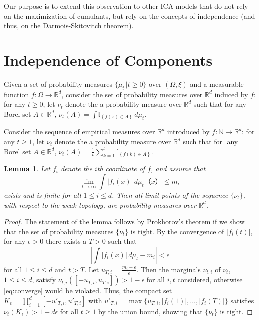 \documentclass[english]{article} %
\newcommand{\ind}[1]{\mathbb{I}_{\left\{ #1 \right\}}}
\newcommand{\real}{\mathbb{R}}
\renewcommand{\natural}{\mathbb{N}}
\providecommand{\lemmaname}{Lemma}
\theoremstyle{plain}
\newtheorem{lemma}[thm]{\protect\lemmaname}
\theoremstyle{definition}
\theoremstyle{remark}
\begin{document}
Our purpose is to extend this observation to other ICA models that do not rely on the maximization of cumulants, but rely on the concepts of independence (and thus, on the Darmois-Skitovitch theorem).

\section{Independence of Components}
\label{sec:IndeofComp}
Given a set of probability measures $\{\mu_t\, \vert t\ge0 \}$ over $(\Omega, \xi)$ and a measurable function $f:\Omega\rightarrow\real^d$, 
consider the set of probability measures over $\real^d$ induced by $f$: 
for any $t\ge0$, let $\nu_t$ denote the a probability measure over $\real^d$ such that for any Borel set $A \in \real^d$, $\nu_t(A)=\int \ind{f(x) \in A}\, d\mu_t$. 

Consider the sequence of empirical measures over $\real^d$ introduced by $f:\natural \rightarrow \real^d$: for any $t\ge 1$, let $\nu_t$ denote the a probability measure over $\real^d$ such that
for $ $ any Borel set $A \in \real^d$, $\nu_t(A)=\tfrac{1}{t} \sum_{k=1}^t \ind{f(k) \in A}$. 
\fi

\begin{lemma}
\label{lem:nicefunction}
Let $f_i$ denote the $i$th coordinate of $f$, and assume that
\begin{equation}
\label{eq:niceproperty}
\lim_{t\to\infty} \int |f_i(x)|\, d\mu_t（x） \le m_i
\end{equation}
exists and is finite for all $1 \le i \le d$.
Then all limit points of the sequence $\{\nu_t\}$, with respect to the weak topology, are probability measures over $\real^d$.
\end{lemma}
\begin{proof}
The statement of the lemma follows by Prokhorov's theorem if we show that the set of probability measures $\{\nu_t\}$ is tight.
By the convergence of $|f_i(t)|$, for any $\epsilon>0$ there exists a $T>0$ such that
\begin{equation}
\label{eq:converge}
\left| \int |f_i(x)|\, d\mu_t - m_i \right| <\epsilon
\end{equation}
for all $1 \le i \le d$ and $t>T$. Let $u_{T,i}=\tfrac{m_i+\epsilon}{\epsilon}$. Then the marginals
$\nu_{t,i}$ of $\nu_t$, $1\le i \le d$, satisfy $\nu_{t,i}([-u_{T,i},u_{T,i}]) > 1-\epsilon$ for all $i,t$ considered, otherwise \eqref{eq:converge} would be violated. Thus, the compact set
$K_{\epsilon}=\prod_{i=1}^d [-u'_{T,i},u'_{T,i}]$ with $u'_{T,i}=\max\{u_{T,i},|f_i(1)|,\ldots,|f_i(T)|\}$ satisfies
$\nu_t(K_{\epsilon})>1-d \epsilon$ for all $t \ge 1$ by the union bound, showing that $\{\nu_t\}$ is tight.
\end{proof}
\end{document}
